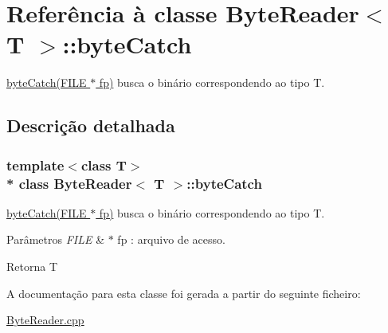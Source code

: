 \hypertarget{class_byte_reader_1_1byte_catch}{}\section{Referência à classe Byte\+Reader$<$ T $>$\+:\+:byte\+Catch}
\label{class_byte_reader_1_1byte_catch}


\hyperlink{class_byte_reader_ae570748805994596f51ae033183935d7}{byte\+Catch(\+F\+I\+L\+E $\ast$ fp)} busca o binário correspondendo ao tipo T.  




\subsection{Descrição detalhada}
\subsubsection*{template$<$class T$>$\\*
class Byte\+Reader$<$ T $>$\+::byte\+Catch}

\hyperlink{class_byte_reader_ae570748805994596f51ae033183935d7}{byte\+Catch(\+F\+I\+L\+E $\ast$ fp)} busca o binário correspondendo ao tipo T. 


\begin{DoxyParams}{Parâmetros}
{\em F\+I\+LE} & $\ast$ fp \+: arquivo de acesso. \\
\hline
\end{DoxyParams}
\begin{DoxyReturn}{Retorna}
T 
\end{DoxyReturn}


A documentação para esta classe foi gerada a partir do seguinte ficheiro\+:\begin{DoxyCompactItemize}
\item 
\hyperlink{_byte_reader_8cpp}{Byte\+Reader.\+cpp}\end{DoxyCompactItemize}
